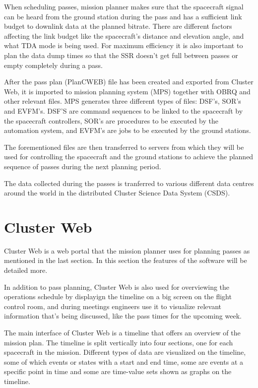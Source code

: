 When scheduling passes, mission planner makes sure that the spacecraft signal can be heard from the ground station during the pass and has a sufficient link budget to downlink data at the planned bitrate. There are different factors affecting the link budget like the spacecraft's distance and elevation angle, and what TDA mode is being used. For maximum efficiency it is also important to plan the data dump times so that the SSR doesn't get full between passes or empty completely during a pass.

After the pass plan (PlanCWEB) file has been created and exported from Cluster Web, it is imported to mission planning system (MPS) together with OBRQ and other relevant files. MPS generates three different types of files: DSF's, SOR's and EVFM's. DSF'S are command sequences to be linked to the spacecraft  by the spacecraft controllers, SOR's are procedures to be executed by the automation system, and EVFM's are jobs to be executed by the ground stations.

The forementioned files are then transferred to servers from which they will be used for controlling the spacecraft and the ground stations to achieve the planned sequence of passes during the next planning period.

The data collected during the passes is tranferred to various different data centres around the world in the distributed Cluster Science Data System (CSDS).

\section{Cluster Web}
Cluster Web is a web portal that the mission planner uses for planning passes as mentioned in the last section. In this section the features of the software will be detailed more.

In addition to pass planning, Cluster Web is also used for overviewing the operations schedule by displayign the timeline on a big screen on the flight control room, and during meetings engineers use it to visualize relevant information that's being discussed, like the pass times for the upcoming week.

The main interface of Cluster Web is a timeline that offers an overview of the mission plan. The timeline is split vertically into four sections, one for each spacecraft in the mission. Different types of data are visualized on the timeline, some of which events or states with a start and end time, some are events at a specific point in time and some are time-value sets shown as graphs on the timeline.

